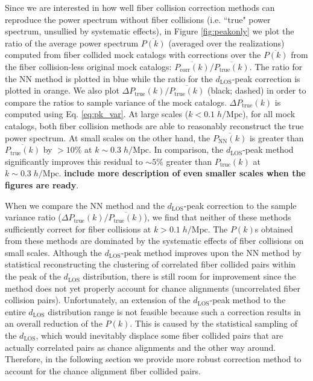 \documentclass{emulateapj}
\begin{document}
Since we are interested in how well fiber collision correction methods can reproduce the power spectrum without fiber collisions (i.e. ``true" power spectrum, unsullied by systematic effects), in Figure \ref{fig:peakonly} we plot the ratio of the average power spectrum $\overline{P(k)}$ (averaged over the realizations) computed from fiber collided mock catalogs with corrections over the $\overline{P(k)}$ from the fiber collision-less original mock catalogs: $\overline{P_{\mathrm{corr}}(k)}/\overline{P_\mathrm{true}(k)}$. The ratio for the NN method is plotted in blue while the ratio for the $d_{\mathrm{LOS}}$-peak correction is plotted in orange. We also plot $\Delta P_\mathrm{true}(k) / \overline{P_\mathrm{true}(k)}$ (black; dashed) in order to compare the ratios to sample variance of the mock catalogs. $\Delta P_\mathrm{true}(k)$ is computed using Eq. \ref{eq:pk_var}. At large scales ($k < 0.1 \; h/\mathrm{Mpc}$), for all mock catalogs, both fiber collision methods are able to reasonably reconstruct the true power spectrum. At small scales on the other hand, the $\overline{P_\mathrm{NN}(k)}$ is greater than $\overline{P_\mathrm{true}(k)}$ by $> 10 \%$ at $ k \sim 0.3\; h/\mathrm{Mpc}$. In comparison, the $d_\mathrm{LOS}$-peak method significantly improves this residual to $\sim 5\%$ greater than $P_\mathrm{true}(k)$ at $k \sim 0.3 \; h/\mathrm{Mpc}$. {\bf include more description of even smaller scales when the figures are ready}. 

When we compare the NN method and the $d_\mathrm{LOS}$-peak correction to the sample variance ratio ($\Delta P_\mathrm{true}(k) / \overline{P_\mathrm{true}(k)}$), we find that neither of these methods sufficiently correct for fiber collisions at $k > 0.1\; h/\mathrm{Mpc}$. The $P(k)$s obtained from these methods are dominated by the systematic effects of fiber collisions on small scales. Although the $d_\mathrm{LOS}$-peak method improves upon the NN method by statistical reconstructing the clustering of correlated fiber collided pairs within the peak of the $d_\mathrm{LOS}$ distribution, there is still room for improvement since the method does not yet properly account for chance alignments (uncorrelated fiber collision pairs). Unfortunately, an extension of the $d_\mathrm{LOS}$-peak method to the entire $d_\mathrm{LOS}$ distribution range is not feasible because such a correction results in an overall reduction of the $P(k)$. This is caused by the statistical sampling of the $d_\mathrm{LOS}$, which would inevitably displace some fiber collided pairs that are actually correlated pairs as chance alignments and the other way around. Therefore, in the following section we provide more robust correction method to account for the chance alignment fiber collided pairs. 
\end{document}
